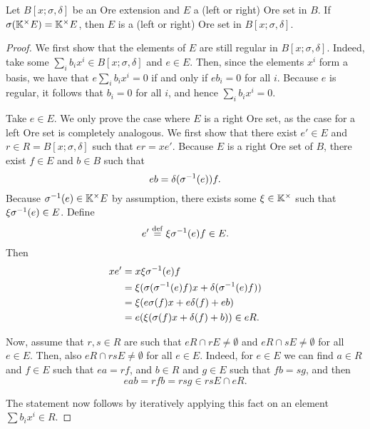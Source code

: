 \begin{lemma}\label{lem:ore_set_ore_extension}
	Let $B[x;\sigma,\delta]$ be an Ore extension and $E$ a (left or right) Ore set in $B$.
	If $\sigma(\mathbb{K}^\times E) = \mathbb{K}^\times E$, then $E$ is a (left or right) Ore set in
	$B[x;\sigma, \delta]$.
\end{lemma}
\begin{proof}
	We first show that the elements of $E$ are still regular in $B[x; \sigma, \delta]$.
	Indeed, take some $\sum_{i} b_i x^i \in B[x; \sigma, \delta]$ and $e \in E$. Then,
	since the elements $x^i$ form a basis, we have that $e \sum_i b_i x^i = 0$ if and only
	if $e b_i = 0$ for all $i$. Because $e$ is regular, it follows that $b_i = 0$ for all
	$i$, and hence $\sum_i b_i x^i = 0$.

	Take $e \in E$. We only prove the case where $E$ is a right Ore set, as the case for a
	left Ore set is completely analogous. We first show that there exist $e' \in E$ and $r
		\in R = B[x; \sigma, \delta]$ such that $er = x e'$. Because $E$ is a right Ore set of
	$B$, there exist $f\in E$ and $b \in B$ such that
	\begin{equation*}
		e b = \delta(\sigma^{-1}(e))f.
	\end{equation*}
	Because $\sigma^{-1}(e) \in \mathbb{K}^\times E$ by assumption, there exists some $\xi \in \mathbb{K}^\times$ such that $\xi \sigma^{-1}(e) \in E$.
	Define
	\begin{equation*}
		e' \overset{\mathrm{def}}{=} \xi \sigma^{-1}(e)f \in E.
	\end{equation*}
	Then
	\begin{align*}
		xe' & = x\xi\sigma^{-1}(e)f                                     \\
		    & = \xi (\sigma(\sigma^{-1}(e)f)x + \delta(\sigma^{-1}(e)f)) \\
		    & = \xi(e\sigma(f)x + e \delta(f) + e b)                   \\
		    & = e(\xi (\sigma(f)x + \delta(f) + b)) \in eR.
	\end{align*}

	Now, assume that $r,s \in R$ are such that $e R \cap r E \neq \emptyset$ and $e R \cap
		s E \neq \emptyset$ for all $e \in E$. Then, also $e R \cap rs E \neq \emptyset$ for
	all $e\in E$. Indeed, for $e \in E$ we can find $a \in R$ and $f \in E$ such that $ea =
		r f$, and $b \in R$ and $g \in E$ such that $f b = s g$, and then
	\begin{equation*}
		e a b = r f b = r s g \in rs E \cap e R.
	\end{equation*}

	The statement now follows by iteratively applying this fact on an element $\sum b_i x^i
		\in R$.
\end{proof}

